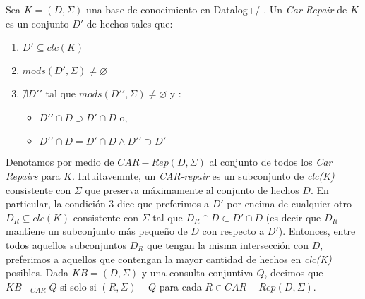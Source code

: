 \documentclass[11pt,a4paper,twoside]{tesis}
\begin{document}
Sea $K = (D, \Sigma)$ una base de conocimiento en Datalog+/-. Un \textit{Car Repair} de $K$ es un conjunto $D\prime$ de hechos tales que:
    \begin{enumerate}
        \item $D\prime \subseteq clc(K)$
        \item $mods(D\prime, \Sigma) \neq \varnothing$
        \item $\nexists D\prime\prime$ tal que $mods(D\prime\prime, \Sigma) \neq \varnothing$ y :
        \begin{itemize}
            \item $D\prime\prime \cap D \supset D\prime \cap D$ o,
            \item $D\prime\prime \cap D = D\prime \cap D \land D\prime\prime \supset D\prime$   
        \end{itemize}
    \end{enumerate}

Denotamos por medio de $CAR-Rep(D, \Sigma)$ al conjunto de todos los \textit{Car Repairs} para $K$.
Intuitavemnte, un \textit{CAR-repair} es un subconjunto de \textit{clc(K)} consistente con $\Sigma$ que preserva máximamente al conjunto de hechos $D$. En particular, la condición 3 dice que preferimos a $D\prime$ por encima de cualquier otro $D_R \subseteq clc(K)$ consistente con $\Sigma$ tal que $D_R \cap D \subset D\prime \cap D$ (es decir que $D_R$ mantiene un subconjunto más pequeño de $D$ con respecto a $D\prime$). Entonces, entre todos aquellos subconjuntos $D_R$ que tengan la misma intersección con $D$, preferimos a aquellos que contengan la mayor cantidad de hechos en \textit{clc(K)} posibles.
Dada $KB = (D, \Sigma)$ y una consulta conjuntiva $Q$, decimos que $KB \models_{CAR} Q$ si solo si $(R, \Sigma) \models Q$ para cada $R \in CAR-Rep(D, \Sigma)$.
\end{document}
